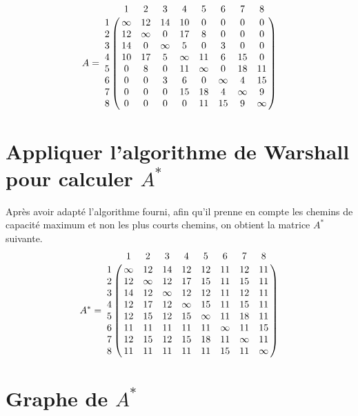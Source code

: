 \documentclass{article}
\begin{document}
$$
A = \bordermatrix{
    & 1 & 2 & 3 & 4 & 5 & 6 & 7 & 8 \cr
  1 & \infty & 12 & 14 & 10 & 0 & 0 & 0 & 0 \cr
  2 & 12 & \infty & 0 & 17 & 8 & 0 & 0 & 0 \cr
  3 & 14 & 0 & \infty & 5 & 0 & 3 & 0 & 0 \cr
  4 & 10 & 17 & 5 & \infty & 11 & 6 & 15 & 0 \cr
  5 & 0 & 8 & 0 & 11 & \infty & 0 & 18 & 11 \cr
  6 & 0 & 0 & 3 & 6 & 0 & \infty & 4 & 15 \cr
  7 & 0 & 0 & 0 & 15 & 18 & 4 & \infty & 9 \cr
  8 & 0 & 0 & 0 & 0 & 11 & 15 & 9 & \infty
}
$$

\section{Appliquer l'algorithme de Warshall pour calculer $A^*$}

Après avoir adapté l'algorithme fourni, afin qu'il prenne en compte
les chemins de capacité maximum et non les plus courts chemins, on
obtient la matrice $A^*$ suivante.\\

$$
A^* = \bordermatrix{
    & 1 & 2 & 3 & 4 & 5 & 6 & 7 & 8 \cr
  1 & \infty & 12 & 14 & 12 & 12 & 11 & 12 & 11 \cr
  2 & 12 & \infty & 12 & 17 & 15 & 11 & 15 & 11 \cr
  3 & 14 & 12 & \infty & 12 & 12 & 11 & 12 & 11 \cr
  4 & 12 & 17 & 12 & \infty & 15 & 11 & 15 & 11 \cr
  5 & 12 & 15 & 12 & 15 & \infty & 11 & 18 & 11 \cr
  6 & 11 & 11 & 11 & 11 & 11 & \infty & 11 & 15 \cr
  7 & 12 & 15 & 12 & 15 & 18 & 11 & \infty & 11 \cr
  8 & 11 & 11 & 11 & 11 & 11 & 15 & 11 & \infty
}
$$

\section{Graphe de $A^*$}

\end{document}
